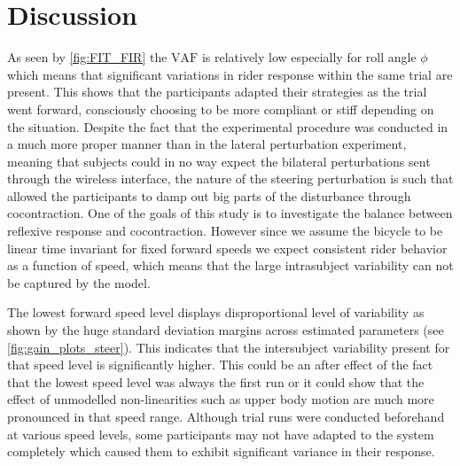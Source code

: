 \section{Discussion}
As seen by \cref{fig:FIT_FIR} the \ensuremath{\mathrm{VAF}} is relatively low especially for roll angle \ensuremath{\phi} which means that significant variations in rider response within the same trial are present. This shows that the participants adapted their strategies as the trial went forward, consciously choosing to be more compliant or stiff depending on the situation. Despite the fact that the experimental procedure was conducted in a much more proper manner than in the lateral perturbation experiment, meaning that subjects could in no way expect the bilateral perturbations sent through the wireless interface, the nature of the steering perturbation is such that allowed the participants to damp out big parts of the disturbance through cocontraction. One of the goals of this study is to investigate  the balance between reflexive response and cocontraction. However since we assume the bicycle to be linear time invariant for fixed forward speeds we expect consistent rider behavior as a function of speed, which means that the large intrasubject variability can not be captured by the model.
 
The lowest forward speed level displays disproportional level of variability as shown by the huge standard deviation margins across estimated parameters (see \cref{fig:gain_plots_steer}). This indicates that the intersubject variability present for that speed level is significantly higher. This could be an after effect of  the fact that the lowest speed level was always the first run or it could show that the effect of unmodelled non-linearities such as upper body motion are much more pronounced in that speed range. Although trial runs were conducted beforehand at various speed levels, some participants may not have adapted to the system completely which caused them to exhibit significant variance in their response.
 
